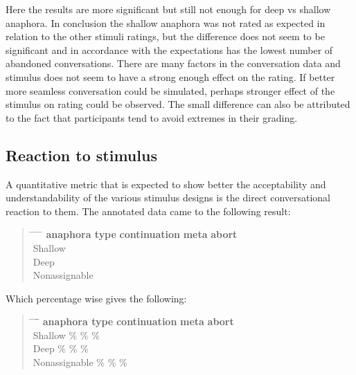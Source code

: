 Here the results are more significant but still not enough for deep vs shallow anaphora.
In conclusion the shallow anaphora was not rated as expected in relation to the other stimuli ratings, but
the difference does not seem to be significant and
in accordance with the expectations has the lowest number of abandoned conversations.
There are many factors in the conversation data and
stimulus does not seem to have a strong enough effect on the rating.
If better more seamless conversation could be simulated,
perhaps stronger effect of the stimulus on rating could be observed.
The small difference can also be attributed to the fact that participants tend to
avoid extremes in their grading.

\subsection{Reaction to stimulus}

A quantitative metric that is expected to show better the acceptability and understandability
of the various stimulus designs is the direct conversational reaction to them.
The annotated data came to the following result:

\begin{quote}
\begin{tabbing}
\hspace{4cm} \= \hspace{3cm} \= \hspace{3cm} \= \hspace{3cm} \= \kill %
\textbf{anaphora type} \> \textbf{continuation} \> \textbf{meta} \> \textbf{abort} \\
Shallow            \\
Deep               \\
Nonassignable      \\
\end{tabbing}
\end{quote}

Which percentage wise gives the following:

\begin{quote}
\begin{tabbing}
\hspace{4cm} \= \hspace{3cm} \= \hspace{3cm} \= \= \hspace{3cm} \kill %
\textbf{anaphora type} \> \textbf{continuation} \> \textbf{meta} \> \textbf{abort} \\
Shallow         \% \% \% \\
Deep            \% \% \% \\
Nonassignable   \% \% \% \\
\end{tabbing}
\end{quote}

